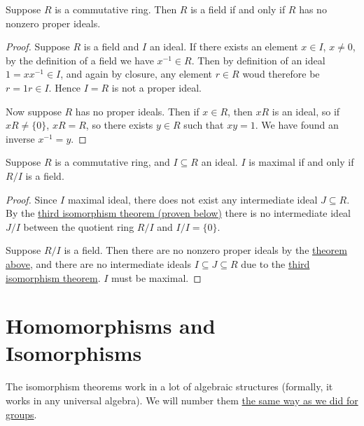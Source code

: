 \begin{proposition}\label{prop:field-no-proper-ideals}
    Suppose \(R\) is a commutative ring.
    Then \(R\) is a field if and only if
    \(R\) has no nonzero proper ideals.
\end{proposition}
\begin{proof}
    Suppose \(R\) is a field and \(I\) an ideal.
    If there exists an element \(x \in I\), \(x \neq 0\),
    by the definition of a field we have \(x^{-1} \in R\).
    Then by definition of an ideal \(1 = xx^{-1} \in I\),
    and again by closure, any element \(r \in R\)
    woud therefore be \(r = 1r \in I\).
    Hence \(I = R\) is not a proper ideal.

    Now suppose \(R\) has no proper ideals.
    Then if \(x \in R\), then \(xR\) is an ideal,
    so if \(xR \neq \{0\}\), \(xR = R\),
    so there exists \(y \in R\) such that \(xy = 1\).
    We have found an inverse \(x^{-1} = y\).
\end{proof}
\begin{corollary}\label{cor:maximal-quotient-field}
    Suppose \(R\) is a commutative ring,
    and \(I \subseteq R\) an ideal.
    \(I\) is maximal if and only if \(R/I\) is a field.
\end{corollary}
\begin{proof}
    Since \(I\) maximal ideal,
    there does not exist any intermediate ideal \(J \subseteq R\).
    By the \hyperref[thm:iso-3-ring]{third isomorphism theorem (proven below)}
    there is no intermediate ideal \(J/I\)
    between the quotient ring \(R/I\) and \(I/I = \{0\}\).

    Suppose \(R/I\) is a field.
    Then there are no nonzero proper ideals by the \hyperref[prop:field-no-proper-ideals]{theorem above},
    and there are no intermediate ideals \(I \subseteq J \subseteq R\)
    due to the \hyperref[thm:iso-3-ring]{third isomorphism theorem}.
    \(I\) must be maximal.
\end{proof}


\section{Homomorphisms and Isomorphisms}

\begin{remark}
    The isomorphism theorems work in a lot of algebraic structures
    (formally, it works in any universal algebra).
    We will number them \hyperref[rmk:iso-numbering]{the same way as we did for groups}.
\end{remark}

